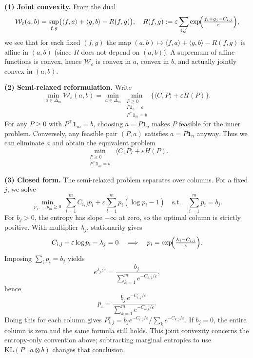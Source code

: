 \documentclass[11pt,a4paper]{article}
\theoremstyle{exostyle}
\newcommand{\W}{\mathcal{W}}
\begin{document}
\begin{solution}
\textbf{(1) Joint convexity.}
From the dual
\[
\W_\varepsilon(a,b)
= \sup_{f,g} \bigl( \langle f,a\rangle + \langle g,b\rangle - R(f,g)\bigr),
\quad
R(f,g):=\varepsilon \sum_{i,j} \exp\!\Bigl(\tfrac{f_i + g_j - C_{i,j}}{\varepsilon}\Bigr),
\]
we see that for each fixed $(f,g)$ the map $(a,b)\mapsto \langle f,a\rangle + \langle g,b\rangle - R(f,g)$ is affine in $(a,b)$ (since $R$ does not depend on $(a,b)$). A supremum of affine functions is convex, hence $\W_\varepsilon$ is convex in $a$, convex in $b$, and actually jointly convex in $(a,b)$.

\medskip
\textbf{(2) Semi-relaxed reformulation.}
Write
\[
\min_{a\in\Delta_m} \W_\varepsilon(a,b)
= \min_{a\in\Delta_m} \min_{\substack{P\ge0\\ P\mathbf 1_n = a\\ P^\top \mathbf 1_m = b}}
\{\langle C,P\rangle + \varepsilon H(P)\}.
\]
For any $P\ge0$ with $P^\top \mathbf 1_m = b$, choosing $a = P\mathbf 1_n$ makes $P$ feasible for the inner problem. Conversely, any feasible pair $(P,a)$ satisfies $a=P\mathbf 1_n$ anyway. Thus we can eliminate $a$ and obtain the equivalent problem
\[
\min_{\substack{P\ge0\\ P^\top \mathbf 1_m = b}}
\ \langle C,P\rangle + \varepsilon H(P).
\]

\medskip
\textbf{(3) Closed form.}
The semi-relaxed problem separates over columns. For a fixed $j$, we solve
\[
\min_{p_1,\dots,p_m\ge0}
\ \sum_{i=1}^m C_{i,j} p_i + \varepsilon \sum_{i=1}^m p_i(\log p_i - 1)
\quad\text{s.t.}\quad \sum_{i=1}^m p_i = b_j.
\]
For $b_j>0$, the entropy has slope $-\infty$ at zero, so the optimal
column is strictly positive. With multiplier $\lambda_j$, stationarity gives
\[
C_{i,j} + \varepsilon \log p_i - \lambda_j = 0
\quad\Longrightarrow\quad
p_i = \exp\!\Bigl(\tfrac{\lambda_j - C_{i,j}}{\varepsilon}\Bigr).
\]
Imposing $\sum_i p_i = b_j$ yields
\[
e^{\lambda_j/\varepsilon} = \frac{b_j}{\sum_{k=1}^m e^{-C_{k,j}/\varepsilon}},
\]
hence
\[
p_i = \frac{b_j\, e^{-C_{i,j}/\varepsilon}}{\sum_{k=1}^m e^{-C_{k,j}/\varepsilon}}.
\]
Doing this for each column gives $P^\star_{i,j}=b_j e^{-C_{i,j}/\varepsilon}/\sum_k e^{-C_{k,j}/\varepsilon}$. If $b_j=0$, the entire column is zero and the same formula still holds. This joint convexity concerns the entropy-only convention above; subtracting marginal entropies to use $\mathrm{KL}(P\mid a\otimes b)$ changes that conclusion.
\end{solution}
\end{document}
